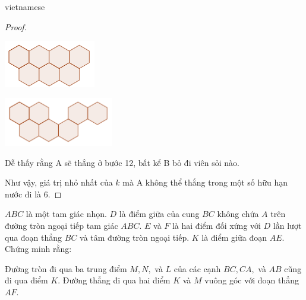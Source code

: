 \documentclass{article}
\begin{document}
\begin{otherlanguage*}{vietnamese}
\begin{proof}
    \begin{center}
        \centering
        \begin{minipage}[t]{4cm}
            \begin{center}
                \includegraphics[width=4cm]{./svg/pdf/pi-2024-1-p3-11a.pdf}
            \end{center}
        \end{minipage}
        \qquad
        \begin{minipage}[t]{4.8cm}
            \begin{center}
                \includegraphics[width=4.8cm]{./svg/pdf/pi-2024-1-p3-11b.pdf}
            \end{center}
        \end{minipage}
    \end{center}

    Dễ thấy rằng A sẽ thắng ở bước 12, bất kể B bỏ đi viên sỏi nào.

    Như vậy, giá trị nhỏ nhất của $k$ mà A không thể thắng trong một số hữu hạn nước đi là $\boxed{6.}$
\end{proof}

\newpage

\begin{example*}[Bài 4]
    $ABC$ là một tam giác nhọn. $D$ là điểm giữa của cung $BC$ không chứa $A$ trên đường tròn ngoại tiếp tam giác $ABC.$
    $E$ và $F$ là hai điểm đối xứng với $D$ lần lượt qua đoạn thẳng $BC$ và tâm đường tròn ngoại tiếp.
    $K$ là điểm giữa đoạn $AE.$ Chứng minh rằng:
    \begin{itemize}[topsep=0pt, partopsep=0pt, itemsep=0pt]
        \ii Đường tròn đi qua ba trung điểm $M, N,$ và $L$ của các cạnh $BC, CA,$ và $AB$ cũng đi qua điểm $K.$
        \ii Đường thẳng đi qua hai điểm $K$ và $M$ vuông góc với đoạn thẳng $AF.$
    \end{itemize} 
\end{example*}


\end{otherlanguage*}
\end{document}
